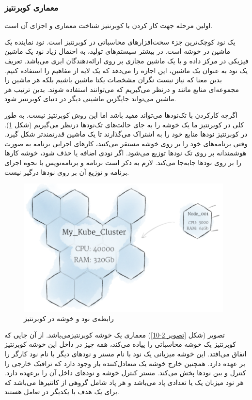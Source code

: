 \newpage

\subsubsection{معماری کوبرنتیز}
اولین مرحله جهت کار کردن با کوبرنتیز شناخت معماری و اجزای آن است.

یک نود کوچک‌ترین جزء سخت‌افزارهای محاسباتی در کوبرنتیز است. نود نماینده یک ماشین در خوشه است. در بیشتر سیستم‌های تولید، به احتمال زیاد نود یک ماشین فیزیکی در مرکز داده و یا یک ماشین مجازی بر روی ارائه‌دهندگان ابری می‌باشد. تعریف یک نود به عنوان یک ماشین، ‌این اجازه را می‌دهد که یک لایه از مفاهیم را استفاده  کنیم. بدین معنا که نیاز نیست نگران مشخصات یکتا ماشین باشیم بلکه هر ماشین را مجموعه‌ای منابع مانند  و  درنظر می‌گیریم که می‌توانند استفاده شوند. بدین ترتیب هر ماشین می‌تواند جایگزین ماشینی دیگر در دنیای کوبرنتیز شود.

اگرچه کارکردن با تک‌نودها می‌تواند مفید باشد اما این روش کوبرنتیز نیست. به طور کلی در کوبرنتیز ما یک خوشه را به جای حالت‌های تک‌نودها درنظر می‌گیریم (شکل \ref{تصویر 2-9}). در کوبرنتیز نودها منابع خود را به اشتراک می‌گذارند تا یک ماشین قدرتمند‌تر شکل گیرد. وقتی برنامه‌های خود را بر روی خوشه مستقر می‌کنید، کارهای اجرایی برنامه به صورت هوشمندانه بر روی تک نودها توزیع می‌شود. اگر نودی اضافه یا حذف شود، خوشه کارها را بر روی نودها  جابه‌جا می‌کند. لازم به ذکر است برنامه و برنامه‌نویس با نحوه اجرای برنامه و توزیع آن بر روی نودها درگیر نیست.

\begin{figure}[!h]
	\centering
	\includegraphics[height=7cm]{images/cluster-and-node}
	\caption{رابطه‌ی نود و خوشه در کوبرنتیز}
	\label{تصویر 2-9}
\end{figure}

تصویر (شکل \ref{تصویر 2-10}) معماری یک خوشه کوبرنتیزمی‌باشد. از آن جایی که کوبرنتیز یک خوشه محاسباتی را پیاده می‌کند، همه چیز در داخل این خوشه کوبرنتیز اتفاق می‌افتد. این خوشه میزبانی یک نود با نام مستر و نودهای دیگر با نام نود کارگر را بر عهده دارد. همچنین خارج خوشه یک متعادل‌کننده بار وجود دارد که ترافیک خارجی را کنترل و بین نودها پخش می‌کند.  مستر کنترل خوشه و نودهای داخل آن را برعهده دارد. هر نود میزبان یک یا تعدادی پاد می‌باشد و هر پاد شامل گروهی از کانتیرها می‌باشد که برای یک هدف با یکدیگر در تعامل هستند.

